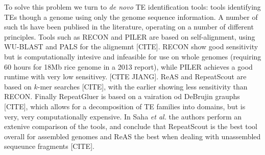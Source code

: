 \documentclass{bmcart}
\begin{document}
To solve this problem we turn to {\it de novo} TE identification
tools: tools identifying TEs though a genome using only the genome
sequence information.  A number of such tls have been publised in the
literature, operating on a number of different principles.  Tools such
as RECON and PILER are based on self-alignment, using WU-BLAST and
PALS for the alignemnt [CITE].  RECON show good sensitivity but is
computationally intesive and infeasible for use on whole genomes (requiring 60 hours for 18Mb rice genome in a 2013
report), while PILER achieves a good runtime with very low
sensitivey. [CITE JIANG].   ReAS and RepeatScout are based on $k$-mer
searches [CITE], with the earlier showing less sensitivity than
RECON.  Finally RepeatGluer is based on a vairation od DeBrujin
grauphs [CITE], which allows for a decomposition of TE families into
domains, but is very, very computationally expensive.  In Saha {\it et
  al.} the authors perform an extenive comparison of the tools, and
conclude that RepeatScout is the best tool overall for assembled
genomes and ReAS the best when dealing with unassembled sequeunce
fragments [CITE].
\end{document}
